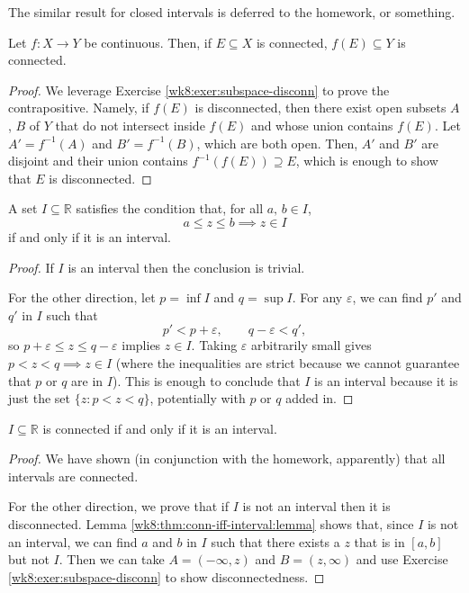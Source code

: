 \documentclass[10pt]{scrartcl}
\providecommand{\eps}{\varepsilon}
\providecommand{\RR}{\mathbb R}
\providecommand{\inv}{^{-1}}
\begin{document}
The similar result for closed intervals is deferred to the homework,
or something.

\begin{theorem}
	\label{wk8:thm:cont-preserve-conn}
	Let $f\colon X\to Y$ be continuous.
	Then, if $E\subseteq X$ is connected, $f(E)\subseteq Y$ is connected.
\end{theorem}

\begin{proof}
	We leverage Exercise \ref{wk8:exer:subspace-disconn}
	to prove the contrapositive.
	Namely, if $f(E)$ is disconnected, then there exist
	open subsets $A$, $B$ of $Y$ that do not intersect inside $f(E)$
	and whose union contains $f(E)$.
	Let $A' = f\inv(A)$ and $B' = f\inv(B)$, which are both open.
	Then, $A'$ and $B'$ are disjoint
	and their union contains $f\inv(f(E))\supseteq E$, which is enough
	to show that $E$ is disconnected.
\end{proof}

\begin{lemma}
	\label{wk8:thm:conn-iff-interval:lemma}
	A set $I\subseteq\RR$ satisfies the condition that,
	for all $a,\,b\in I$,
	\[a\le z\le b\implies z\in I\]
	if and only if it is an interval.
\end{lemma}
\begin{proof}
	If $I$ is an interval then the conclusion is trivial.
	
	For the other direction, let $p = \inf I$ and $q = \sup I$.
	For any $\eps$, we can find $p'$ and $q'$ in $I$ such that
	\[p' < p + \eps,\qquad q - \eps < q',\]
	so $p + \eps \le z \le q-\eps$ implies $z\in I$.
	Taking $\eps$ arbitrarily small gives $p < z < q\implies z\in I$
	(where the inequalities are strict because
	we cannot guarantee that $p$ or $q$ are in $I$).
	This is enough to conclude that $I$ is an interval
	because it is just the set $\{z : p < z < q\}$,
	potentially with $p$ or $q$ added in.
\end{proof}

\begin{theorem}
	\label{wk8:thm:conn-iff-interval}
	$I\subseteq\RR$ is connected if and only if it is an interval.
\end{theorem}
\begin{proof}
	We have shown (in conjunction with the homework, apparently)
	that all intervals are connected.
	
	For the other direction, we prove that
	if $I$ is not an interval then it is disconnected.
	Lemma \ref{wk8:thm:conn-iff-interval:lemma}
	shows that, since $I$ is not an interval,
	we can find $a$ and $b$ in $I$ such that
	there exists a $z$ that is in $[a, b]$ but not $I$.
	Then we can take $A = (-\infty,z)$ and $B = (z,\infty)$
	and use Exercise \ref{wk8:exer:subspace-disconn} to show disconnectedness.
\end{proof}
\end{document}
